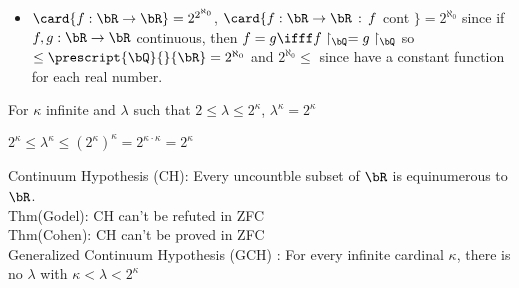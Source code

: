 \begin{itemize}
    \item $\card \{f : \bR \to \bR\}  =2^{2^{\aleph_0}}$, $\card \{f :  \bR \to \bR \, :\, f$ cont $\} = 2^{\aleph_0}$ since if $f, g : \bR \to \bR$ continuous, then $f = g \ifff f \upharpoonright_{\bQ} = g \upharpoonright_{\bQ}$ so $\le \prescript{\bQ}{}{\bR} = 2^{\aleph_0}$ and $2^{\aleph_0} \le $ since have a constant function for each real number. 
\end{itemize}

\begin{theorem}
    For $\kappa$ infinite and $\lambda$ such that $2 \le \lambda \le 2^{\kappa}$, $\lambda^{\kappa} = 2^{\kappa}$ 
\end{theorem}

\begin{pf}
    $2^{\kappa} \le \lambda^{\kappa} \le (2^{\kappa})^{\kappa} = 2^{\kappa \cdot \kappa} = 2^{\kappa}$
\end{pf}

\noindent
Continuum Hypothesis (CH): Every uncountble subset of $\bR$ is equinumerous to $\bR$. \\
Thm(Godel): CH can't be refuted in ZFC \\ 
Thm(Cohen): CH can't be proved in ZFC \\ 
Generalized Continuum Hypothesis (GCH) : For every infinite cardinal $\kappa$, there is no $\lambda$ with $\kappa < \lambda < 2^{\kappa}$ 